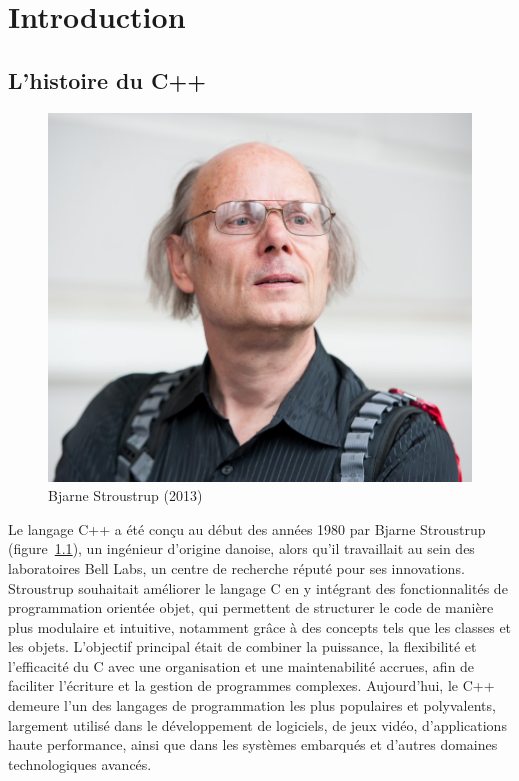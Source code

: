 \lstset{  %
	language=bash,
	basicstyle=\ttfamily,
}

\chapter{Introduction}
\section{L'histoire du C++}

\begin{figure}[ht]
	\centering
	\includegraphics{Images/bjarne_stroustrup}
	\caption{Bjarne Stroustrup (2013)}
	\label{bjarne_stroustrup}
\end{figure}

Le langage C++ a été conçu au début des années 1980 par Bjarne Stroustrup (figure~\ref{bjarne_stroustrup}), un ingénieur d'origine danoise, alors qu'il travaillait au sein des laboratoires Bell Labs, un centre de recherche réputé pour ses innovations. Stroustrup souhaitait améliorer le langage C en y intégrant des fonctionnalités de programmation orientée objet, qui permettent de structurer le code de manière plus modulaire et intuitive, notamment grâce à des concepts tels que les classes et les objets. L'objectif principal était de combiner la puissance, la flexibilité et l'efficacité du C avec une organisation et une maintenabilité accrues, afin de faciliter l'écriture et la gestion de programmes complexes. Aujourd'hui, le C++ demeure l'un des langages de programmation les plus populaires et polyvalents, largement utilisé dans le développement de logiciels, de jeux vidéo, d'applications haute performance, ainsi que dans les systèmes embarqués et d'autres domaines technologiques avancés.


